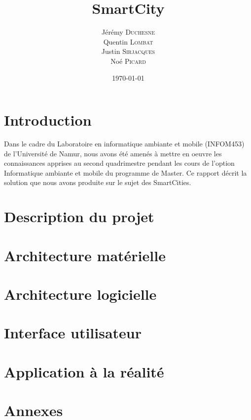 \documentclass[12pt,a4paper]{article}
\title{SmartCity}
\author{Jérémy \textsc{Duchesne}\\Quentin \textsc{Lombat}\\Justin \textsc{Sirjacques}\\Noé \textsc{Picard}}
\date{\today}
\begin{document}


\tableofcontents

\newpage
\section*{Introduction}
Dans le cadre du Laboratoire en informatique ambiante et mobile (INFOM453) de l'Université de Namur, nous avons été amenés à mettre en oeuvre les connaissances apprises au second quadrimestre pendant les cours de l'option Informatique ambiante et mobile du programme de Master. Ce rapport décrit la solution que nous avons produite sur le sujet des SmartCities.

\section{Description du projet}

\newpage




\newpage
\section{Architecture matérielle}



\newpage
\section{Architecture logicielle}




\newpage
\section{Interface utilisateur}



\newpage
\section{Application à la réalité}



\newpage
\section{Annexes}

\end{document}
